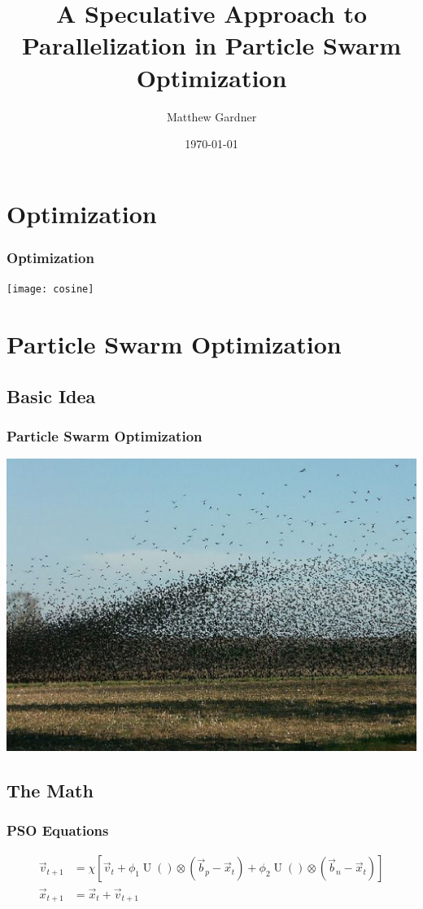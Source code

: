 \documentclass{beamer}
\title{A Speculative Approach to Parallelization in Particle Swarm Optimization}
\author{Matthew Gardner}
\date{\today}
\DeclareMathOperator{\URand}{U}
\providecommand{\ppos}{\ensuremath{\Vec{x}}}
\providecommand{\pvel}{\ensuremath{\Vec{v}}}
\providecommand{\nbest}{\ensuremath{\Vec{b}_n}}
\providecommand{\pbest}{\ensuremath{\Vec{b}_p}}
\providecommand{\constriction}{\ensuremath{\chi}}
\providecommand{\coeff}{\ensuremath{\phi}}
\begin{document}
\begin{frame}
  \titlepage
\end{frame}

\section{Optimization}
\begin{frame}
  \frametitle{Optimization}
  \texttt{[image: cosine]}
\end{frame}

\section{Particle Swarm Optimization}
\subsection{Basic Idea}
\begin{frame}
  \frametitle{Particle Swarm Optimization}
  \includegraphics[width=\textwidth]{birds}
\end{frame}

\subsection{The Math}
\begin{frame}
  \frametitle{PSO Equations}
  \begin{align*}
	  \pvel_{t+1} &=
		  \constriction \left[ \pvel_t +
			  \coeff_1\URand()\otimes(\pbest - \ppos_t) +
			  \coeff_2\URand()\otimes(\nbest - \ppos_t)
		  \right] \\
	  \ppos_{t+1} &= \ppos_t + \pvel_{t+1}
  \end{align*}
\end{frame}
\end{document}
